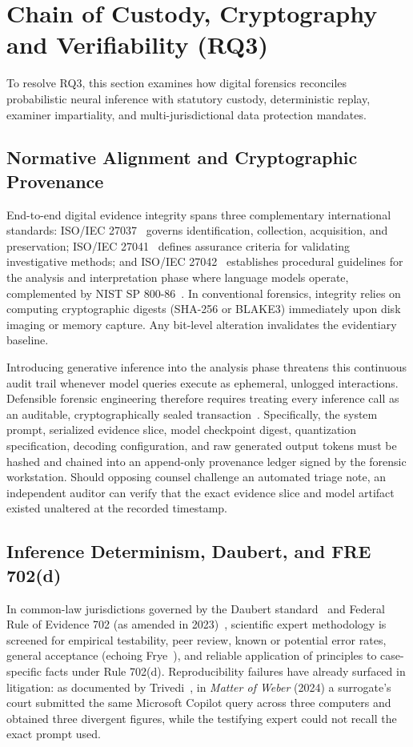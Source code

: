 \section{Chain of Custody, Cryptography and Verifiability (RQ3)}
\label{sec:custody_crypto}

To resolve RQ3, this section examines how digital forensics reconciles probabilistic neural inference with statutory custody, deterministic replay, examiner impartiality, and multi-jurisdictional data protection mandates.

\subsection{Normative Alignment and Cryptographic Provenance}
End-to-end digital evidence integrity spans three complementary international standards: ISO/IEC 27037~\cite{iso27037_2012} governs identification, collection, acquisition, and preservation; ISO/IEC 27041~\cite{iso27041_2015} defines assurance criteria for validating investigative methods; and ISO/IEC 27042~\cite{iso27042_2015} establishes procedural guidelines for the analysis and interpretation phase where language models operate, complemented by NIST SP 800-86~\cite{nist_sp800_86}. In conventional forensics, integrity relies on computing cryptographic digests (SHA-256 or BLAKE3) immediately upon disk imaging or memory capture. Any bit-level alteration invalidates the evidentiary baseline.

Introducing generative inference into the analysis phase threatens this continuous audit trail whenever model queries execute as ephemeral, unlogged interactions. Defensible forensic engineering therefore requires treating every inference call as an auditable, cryptographically sealed transaction~\cite{sharma2025_forensicllm, chernyshev2026_large, tiwari2026_xforensicnet}. Specifically, the system prompt, serialized evidence slice, model checkpoint digest, quantization specification, decoding configuration, and raw generated output tokens must be hashed and chained into an append-only provenance ledger signed by the forensic workstation. Should opposing counsel challenge an automated triage note, an independent auditor can verify that the exact evidence slice and model artifact existed unaltered at the recorded timestamp.

\subsection{Inference Determinism, Daubert, and FRE 702(d)}
In common-law jurisdictions governed by the Daubert standard~\cite{daubert1993} and Federal Rule of Evidence 702 (as amended in 2023)~\cite{fre702_2023}, scientific expert methodology is screened for empirical testability, peer review, known or potential error rates, general acceptance (echoing Frye~\cite{frye1923}), and reliable application of principles to case-specific facts under Rule 702(d). Reproducibility failures have already surfaced in litigation: as documented by Trivedi~\cite{trivedi2026_when}, in \textit{Matter of Weber} (2024) a surrogate's court submitted the same Microsoft Copilot query across three computers and obtained three divergent figures, while the testifying expert could not recall the exact prompt used.

